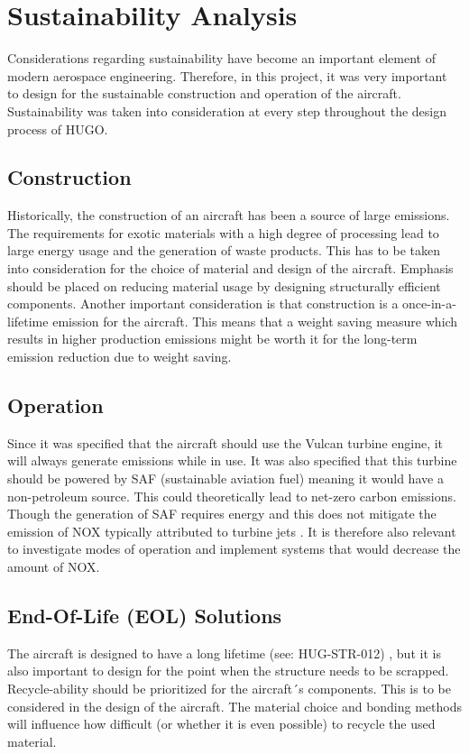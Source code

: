 
\chapter{Sustainability Analysis}
Considerations regarding sustainability have become an important element of modern aerospace engineering. Therefore, in this project, it was very important to design for the sustainable construction and operation of the aircraft. Sustainability was taken into consideration at every step throughout the design process of HUGO. 

\section{Construction}

Historically, the construction of an aircraft has been a source of large emissions. The requirements for exotic materials with a high degree of processing lead to large energy usage and the generation of waste products. This has to be taken into consideration for the choice of material and design of the aircraft. Emphasis should be placed on reducing material usage by designing structurally efficient components. Another important consideration is that construction is a once-in-a-lifetime emission for the aircraft. This means that a weight saving measure which results in higher production emissions might be worth it for the long-term emission reduction due to weight saving.  

\section{Operation}
Since it was specified that the aircraft should use the Vulcan turbine engine, it will always generate emissions while in use. It was also specified that this turbine should be powered by SAF (sustainable aviation fuel) meaning it would have a non-petroleum source. This could theoretically lead to net-zero carbon emissions. Though the generation of SAF requires energy and this does not mitigate the emission of NOX typically attributed to turbine jets \cite{Jarin2024}. It is therefore also relevant to investigate modes of operation and implement systems that would decrease the amount of NOX.      


\section{End-Of-Life (EOL) Solutions}

The aircraft is designed to have a long lifetime (see: HUG-STR-012) , but it is also important to design for the point when the structure needs to be scrapped. Recycle-ability should be prioritized for  the aircraft´s components. This is to be considered in the design of the aircraft. The material choice and bonding methods will influence how difficult (or whether it is even possible) to recycle the used material. 


